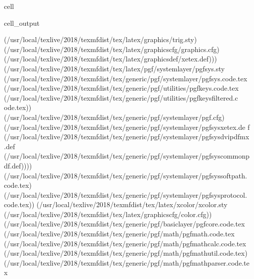 \documentclass[letterpaper,10pt,english]{jupyterBook}
\begin{document}
\begin{sphinxuseclass}{cell}
\begin{sphinxVerbatimOutput}
\begin{sphinxuseclass}{cell_output}
\begin{sphinxVerbatim}[commandchars=\\\{\}]
(/usr/local/texlive/2018/texmf\PYGZhy{}dist/tex/latex/graphics/trig.sty)
(/usr/local/texlive/2018/texmf\PYGZhy{}dist/tex/latex/graphics\PYGZhy{}cfg/graphics.cfg)
(/usr/local/texlive/2018/texmf\PYGZhy{}dist/tex/latex/graphics\PYGZhy{}def/xetex.def)))
(/usr/local/texlive/2018/texmf\PYGZhy{}dist/tex/latex/pgf/systemlayer/pgfsys.sty
(/usr/local/texlive/2018/texmf\PYGZhy{}dist/tex/generic/pgf/systemlayer/pgfsys.code.tex
(/usr/local/texlive/2018/texmf\PYGZhy{}dist/tex/generic/pgf/utilities/pgfkeys.code.tex
(/usr/local/texlive/2018/texmf\PYGZhy{}dist/tex/generic/pgf/utilities/pgfkeysfiltered.c
ode.tex))
(/usr/local/texlive/2018/texmf\PYGZhy{}dist/tex/generic/pgf/systemlayer/pgf.cfg)
(/usr/local/texlive/2018/texmf\PYGZhy{}dist/tex/generic/pgf/systemlayer/pgfsys\PYGZhy{}xetex.de
f
(/usr/local/texlive/2018/texmf\PYGZhy{}dist/tex/generic/pgf/systemlayer/pgfsys\PYGZhy{}dvipdfmx
.def
(/usr/local/texlive/2018/texmf\PYGZhy{}dist/tex/generic/pgf/systemlayer/pgfsys\PYGZhy{}common\PYGZhy{}p
df.def))))
(/usr/local/texlive/2018/texmf\PYGZhy{}dist/tex/generic/pgf/systemlayer/pgfsyssoftpath.
code.tex)
(/usr/local/texlive/2018/texmf\PYGZhy{}dist/tex/generic/pgf/systemlayer/pgfsysprotocol.
code.tex)) (/usr/local/texlive/2018/texmf\PYGZhy{}dist/tex/latex/xcolor/xcolor.sty
(/usr/local/texlive/2018/texmf\PYGZhy{}dist/tex/latex/graphics\PYGZhy{}cfg/color.cfg))
(/usr/local/texlive/2018/texmf\PYGZhy{}dist/tex/generic/pgf/basiclayer/pgfcore.code.tex
(/usr/local/texlive/2018/texmf\PYGZhy{}dist/tex/generic/pgf/math/pgfmath.code.tex
(/usr/local/texlive/2018/texmf\PYGZhy{}dist/tex/generic/pgf/math/pgfmathcalc.code.tex
(/usr/local/texlive/2018/texmf\PYGZhy{}dist/tex/generic/pgf/math/pgfmathutil.code.tex)
(/usr/local/texlive/2018/texmf\PYGZhy{}dist/tex/generic/pgf/math/pgfmathparser.code.tex
\end{sphinxVerbatim}


\end{sphinxuseclass}
\end{sphinxVerbatimOutput}
\end{sphinxuseclass}
\end{document}
